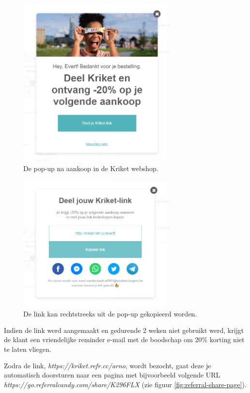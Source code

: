 \begin{figure}[h!]
	\includegraphics[width=80mm,scale=0.7]{img/referral-pop-up-1.png}
	\centering
	\caption{De pop-up na aankoop in de Kriket webshop.}
	\label{fig:referral-popup-webshop-1}
\end{figure}
\begin{figure}[h!]
\includegraphics[width=80mm,scale=0.7]{img/referral-pop-up-2.png}
\centering
\caption{De link kan rechtstreeks uit de pop-up gekopieerd worden.}
\label{fig:referral-popup-webshop-2}
\end{figure}

Indien de link werd aangemaakt en gedurende 2 weken niet gebruikt werd, krijgt de klant een vriendelijke reminder e-mail met de boodschap om 20\% korting niet te laten vliegen.

Zodra de link, \emph{https://kriket.refr.cc/arno}, wordt bezocht, gaat deze je automatisch doorsturen naar een pagina met bijvoorbeeld volgende URL \emph{https://go.referralcandy.com/share/K296FLX} (zie figuur \ref{fig:referral-share-page}). 

